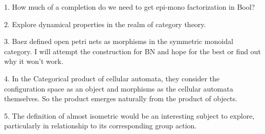 1. How much of a completion do we need to get epi-mono factorization in Bool?

2. Explore dynamical properties in the realm of category theory.

3. Baez defined open petri nets as morphisms in the symmetric monoidal category. I will attempt the construction for BN and hope for the best or find out why it won't work.

4. In the Categorical product of cellular automata, they consider the configuration space as an object and morphisms as the cellular automata themselves. So the product emerges naturally from the product of objects. 

5. The definition of almost isometric would be an interesting subject to explore, particularly in relationship to its corresponding group action.